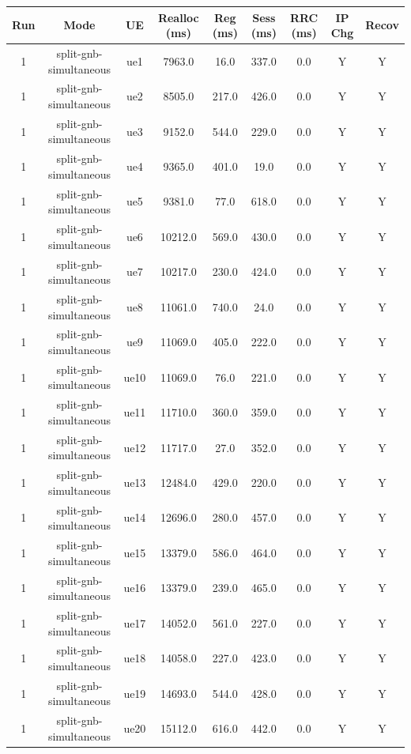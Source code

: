\begin{table}[ht]
\centering
\begin{tabular}{|c|c|c|c|c|c|c|c|c|}
\hline
Run & Mode & UE & Realloc (ms) & Reg (ms) & Sess (ms) & RRC (ms) & IP Chg & Recov \\
\hline
1 & split-gnb-simultaneous & ue1 & 7963.0 & 16.0 & 337.0 & 0.0 & Y & Y \\
1 & split-gnb-simultaneous & ue2 & 8505.0 & 217.0 & 426.0 & 0.0 & Y & Y \\
1 & split-gnb-simultaneous & ue3 & 9152.0 & 544.0 & 229.0 & 0.0 & Y & Y \\
1 & split-gnb-simultaneous & ue4 & 9365.0 & 401.0 & 19.0 & 0.0 & Y & Y \\
1 & split-gnb-simultaneous & ue5 & 9381.0 & 77.0 & 618.0 & 0.0 & Y & Y \\
1 & split-gnb-simultaneous & ue6 & 10212.0 & 569.0 & 430.0 & 0.0 & Y & Y \\
1 & split-gnb-simultaneous & ue7 & 10217.0 & 230.0 & 424.0 & 0.0 & Y & Y \\
1 & split-gnb-simultaneous & ue8 & 11061.0 & 740.0 & 24.0 & 0.0 & Y & Y \\
1 & split-gnb-simultaneous & ue9 & 11069.0 & 405.0 & 222.0 & 0.0 & Y & Y \\
1 & split-gnb-simultaneous & ue10 & 11069.0 & 76.0 & 221.0 & 0.0 & Y & Y \\
1 & split-gnb-simultaneous & ue11 & 11710.0 & 360.0 & 359.0 & 0.0 & Y & Y \\
1 & split-gnb-simultaneous & ue12 & 11717.0 & 27.0 & 352.0 & 0.0 & Y & Y \\
1 & split-gnb-simultaneous & ue13 & 12484.0 & 429.0 & 220.0 & 0.0 & Y & Y \\
1 & split-gnb-simultaneous & ue14 & 12696.0 & 280.0 & 457.0 & 0.0 & Y & Y \\
1 & split-gnb-simultaneous & ue15 & 13379.0 & 586.0 & 464.0 & 0.0 & Y & Y \\
1 & split-gnb-simultaneous & ue16 & 13379.0 & 239.0 & 465.0 & 0.0 & Y & Y \\
1 & split-gnb-simultaneous & ue17 & 14052.0 & 561.0 & 227.0 & 0.0 & Y & Y \\
1 & split-gnb-simultaneous & ue18 & 14058.0 & 227.0 & 423.0 & 0.0 & Y & Y \\
1 & split-gnb-simultaneous & ue19 & 14693.0 & 544.0 & 428.0 & 0.0 & Y & Y \\
1 & split-gnb-simultaneous & ue20 & 15112.0 & 616.0 & 442.0 & 0.0 & Y & Y \\

\end{tabular}
\end{table}
